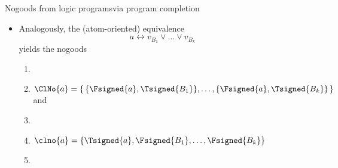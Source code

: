 \begin{frame}{Nogoods from logic programs}{via program completion}

  \begin{itemize}
  \item Analogously, the (atom-oriented) equivalence
    \[
    a \leftrightarrow v_{B_1} \vee \dots \vee v_{B_k}
    \]
    yields the nogoods
    \begin{enumerate}
    \item []
    \item
      \(
      \ClNo{a} = \{\,\{\Fsigned{a},\Tsigned{B_1}\},\dots,\{\Fsigned{a},\Tsigned{B_k}\}\,\}
      \)
      and
    \item []
    \item
      \(
      \clno{a} = \{\Tsigned{a},\Fsigned{B_1},\dots,\Fsigned{B_k}\}
      \)
    \item []
    \end{enumerate}
  \end{itemize}
\end{frame}
